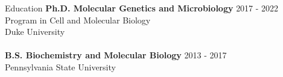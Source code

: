 \documentclass{resume} %
\begin{document}





\begin{rSection}{Education}
{\bf Ph.D. Molecular Genetics and Microbiology } \hfill {2017 - 2022} 
\\ Program in Cell and Molecular Biology
\\ Duke University
\\ \\
{\bf B.S. Biochemistry and Molecular Biology} \hfill {2013 - 2017} 
\\ Pennsylvania State University
\\
\end{rSection}
\end{document}

